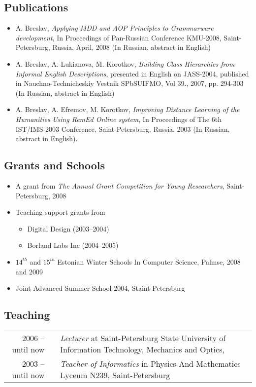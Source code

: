 \documentclass[a4paper, 12pt]{article}
\begin{document}
\subsection*{Publications}
\begin{itemize}
	\item A. Breslav, {\it Applying MDD and AOP Principles to Grammarware development}, In Proceedings of Pan-Russian Conference KMU-2008, Saint-Petersburg, Russia, April, 2008 (In Russian, abstract in English)
	\item A. Breslav, A. Lukianova, M. Korotkov, {\it Building Class Hierarchies from Informal English Descriptions}, presented in English on JASS-2004, published in Nauchno-Technicheskiy Vestnik SPbSUIFMO, Vol 39., 2007, pp. 294-303 (In Russian, abstract in English)
	\item A. Breslav, A. Efremov, M. Korotkov, {\it Improving Distance Learning of the Humanities Using {\it RemEd} Online system}, In Proceedings of The 6th IST/IMS-2003 Conference, Saint-Petersburg, Russia, 2003 (In Russian, abstract in English).
\end{itemize}

\subsection*{Grants and Schools}
\begin{itemize}
	\item A grant from {\it The Annual Grant Competition for Young Researchers}, Saint-Petersburg, 2008
	\item {Teaching support grants from 
		\begin{itemize}
			\item Digital Design (2003--2004)  
			\item Borland Labs Inc (2004--2005) 
		\end{itemize}}
	\item $14^{th}$ and $15^{th}$ Estonian Winter Schools In Computer Science, Palmse, 2008 and 2009
	\item Joint Advanced Summer School 2004, Staint-Petersburg
\end{itemize}

\subsection*{Teaching}
\begin{tabular}{ r l p{370pt} }
	2006 -- until now && {\it Lecturer} at Saint-Petersburg State University of Information Technology, Mechanics and Optics,\\
	2003 -- until now && {\it Teacher of Informatics} in Physics-And-Mathematics Lyceum N239, Saint-Petersburg\\%
\end{tabular}
\end{document}
